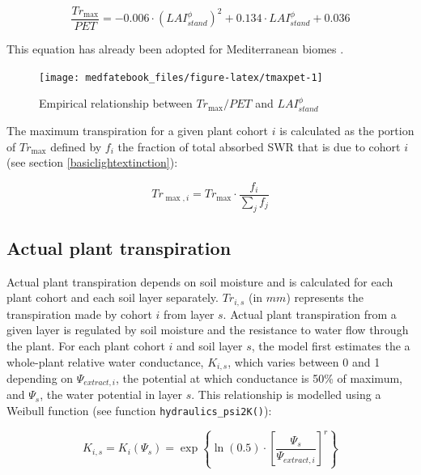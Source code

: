\documentclass[]{book}
\begin{document}
\begin{equation}
\frac{Tr_{\max}}{PET}= -0.006\cdot (LAI^{\phi}_{stand})^2+0.134\cdot LAI^{\phi}_{stand}+0.036
\end{equation}

This equation has already been adopted for Mediterranean biomes
\citep{Fyllas2009, Ruffault2013}.




\begin{figure}

{\centering \texttt{[image: medfatebook\_files/figure-latex/tmaxpet-1]} 

}

\caption{Empirical relationship between \(Tr_{\max}/PET\) and
\(LAI^{\phi}_{stand}\)}\label{fig:tmaxpet}
\end{figure}

The maximum transpiration for a given plant cohort \(i\) is calculated
as the portion of \(Tr_{\max}\) defined by \(f_i\) the fraction of total
absorbed SWR that is due to cohort \(i\) (see section
\ref{basiclightextinction}):

\begin{equation}
Tr_{\max, i} = Tr_{\max} \cdot \frac{f_i}{\sum_{j}{f_j}}
\end{equation}

\subsection{Actual plant
transpiration}\label{actual-plant-transpiration}

Actual plant transpiration depends on soil moisture and is calculated
for each plant cohort and each soil layer separately. \(Tr_{i,s}\) (in
\(mm\)) represents the transpiration made by cohort \(i\) from layer
\(s\). Actual plant transpiration from a given layer is regulated by
soil moisture and the resistance to water flow through the plant. For
each plant cohort \(i\) and soil layer \(s\), the model first estimates
the a whole-plant relative water conductance, \(K_{i,s}\), which varies
between 0 and 1 depending on \(\Psi_{extract,i}\), the potential at
which conductance is 50\% of maximum, and \(\Psi_s\), the water
potential in layer \(s\). This relationship is modelled using a Weibull
function (see function \texttt{hydraulics\_psi2K()}):

\begin{equation}
K_{i,s}=K_{i}(\Psi_s) = \exp \left \{\ln{(0.5)}\cdot \left[ \frac{\Psi_s}{\Psi_{extract,i}} \right] ^r \right \} 
\label{eq:relativewholeplantconductance}
\end{equation}
\end{document}
